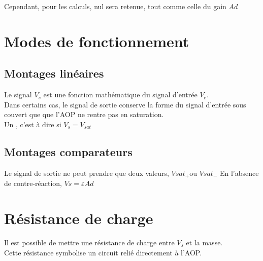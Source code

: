 

Cependant, pour les calculs,  nul sera retenue, tout comme celle du gain $Ad$


\section{ Modes de fonctionnement}


\subsection{Montages linéaires }
Le signal $V_s$ est une fonction mathématique du signal d’entrée $V_e$. \\

Dans certains cas, le signal de sortie conserve la forme du signal d’entrée sous couvert que que l’AOP ne rentre pas en saturation. \\


Un , c’est à dire si $V_s=V_{sat}$




\subsection{Montages comparateurs}

Le signal de sortie ne peut prendre que deux valeurs, $Vsat_+$ou $Vsat_-$
En l’absence de contre-réaction, $Vs=\varepsilon Ad$ \\



\section{Résistance de charge}

Il est possible de mettre une résistance de charge entre $V_s$ et la masse. \\

Cette résistance symbolise un circuit relié directement à l'AOP. \\

